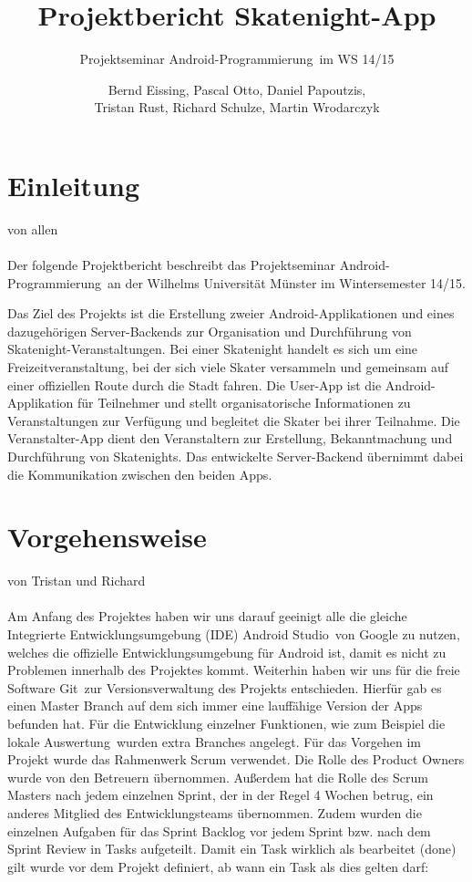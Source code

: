 \documentclass[a4paper, titlepage]{scrartcl}
\title{Projektbericht Skatenight-App}
\subtitle{Projektseminar \glqq Android-Programmierung\grqq\ im WS 14/15}
\author{Bernd Eissing, Pascal Otto, Daniel Papoutzis,\\Tristan Rust, Richard Schulze, Martin Wrodarczyk}
\date{}
\newcommand{\AUTHOR}[1]{
	von #1 \\ \\
}
\begin{document}
\maketitle

\tableofcontents
\newpage

\section{Einleitung}
\AUTHOR{allen}
Der folgende Projektbericht beschreibt das Projektseminar \glqq Android-Programmierung\grqq\ an der Wilhelms Universität Münster im Wintersemester 14/15.

Das Ziel des Projekts ist die Erstellung zweier Android-Applikationen und eines dazugehörigen Server-Backends zur Organisation und Durchführung von Skatenight-Veranstal\-tun\-gen. Bei einer Skatenight handelt es sich um eine Freizeitveranstaltung, bei der sich viele Skater versammeln und gemeinsam auf einer offiziellen Route durch die Stadt fahren. Die User-App ist die Android-Applikation für Teilnehmer und stellt organisatorische Informationen zu Veranstaltungen zur Verfügung und begleitet die Skater bei ihrer Teilnahme. Die Veranstalter-App dient den Veranstaltern zur Erstellung, Bekanntmachung und Durchführung von Skatenights. Das entwickelte Server-Backend übernimmt dabei die Kommunikation zwischen den beiden Apps.

\section{Vorgehensweise}
\label{sec:vorgehensweise}
\AUTHOR{Tristan und Richard}
Am Anfang des Projektes haben wir uns darauf geeinigt alle die gleiche Integrierte Entwicklungsumgebung (IDE) \glqq Android Studio\grqq\ von Google zu nutzen, welches die offizielle Entwicklungsumgebung für Android ist, damit es nicht zu Problemen innerhalb des Projektes kommt.
Weiterhin haben wir uns für die freie Software \glqq Git\grqq\ zur Versionsverwaltung des Projekts entschieden. Hierfür gab es einen Master Branch auf dem sich immer eine lauffähige Version der Apps befunden hat. Für die Entwicklung einzelner Funktionen, wie zum Beispiel die \glqq lokale Auswertung\grqq\ wurden extra Branches angelegt.
Für das Vorgehen im Projekt wurde das Rahmenwerk Scrum verwendet. Die Rolle des Product Owners wurde von den Betreuern übernommen. Außerdem hat die Rolle des Scrum Masters nach jedem einzelnen Sprint, der in der Regel 4 Wochen betrug, ein anderes Mitglied des Entwicklungsteams übernommen. Zudem wurden die einzelnen Aufgaben für das Sprint Backlog vor jedem Sprint bzw. nach dem Sprint Review in Tasks aufgeteilt. Damit ein Task wirklich als bearbeitet (\glqq done\grqq) gilt wurde vor dem Projekt definiert, ab wann ein Task als dies gelten darf:
\end{document}
